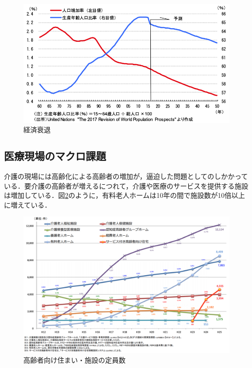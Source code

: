 \begin{figure}[htb]
 \begin{center}
 \includegraphics[scale=0.6]{figures/population_GDP_relation}
 \caption[経済衰退]{経済衰退 \label{population_GDP_relation}}
 \end{center}
\end{figure}

\subsection{医療現場のマクロ課題}

介護の現場には高齢化による高齢者の増加が，逼迫した問題としてのしかかっている．要介護の高齢者が増えるにつれて，介護や医療のサービスを提供する施設は増加している．図\ref{nurse_facility_increase}のように，有料老人ホームは10年の間で施設数が10倍以上に増えている．

\begin{figure}[htb]
 \begin{center}
 \includegraphics[scale=0.4]{figures/nurse_facility_increase}
 \caption[高齢者向け住まい・施設の定員数]{高齢者向け住まい・施設の定員数 \label{nurse_facility_increase}}
 \end{center}
\end{figure}

